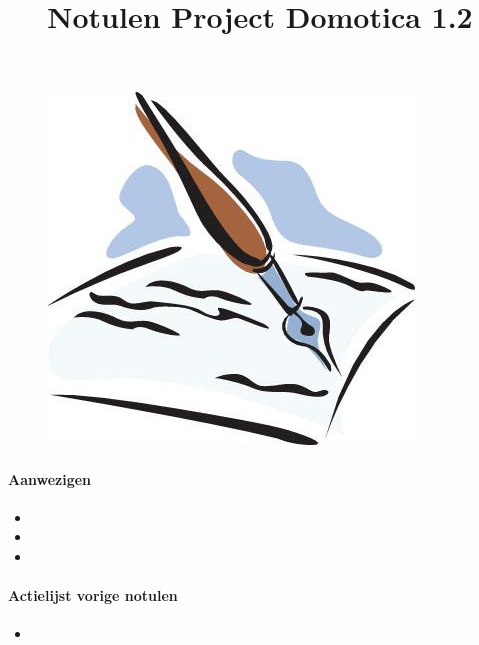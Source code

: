 \documentclass[11pt]{article}
\title{Notulen Project Domotica 1.2}
\date{} %
\begin{document}
\thispagestyle{empty}
\maketitle %
\begin{figure}[h]
	\includegraphics[width=\textwidth]{notulen}
	\date{} %
\end{figure}
\newpage
\paragraph{Aanwezigen}
\begin{itemize}
	\item 
	\item 
	\item 
\end{itemize}

\paragraph{Actielijst vorige notulen}
\begin{itemize}
\item 
\end{itemize}
\end{document}
